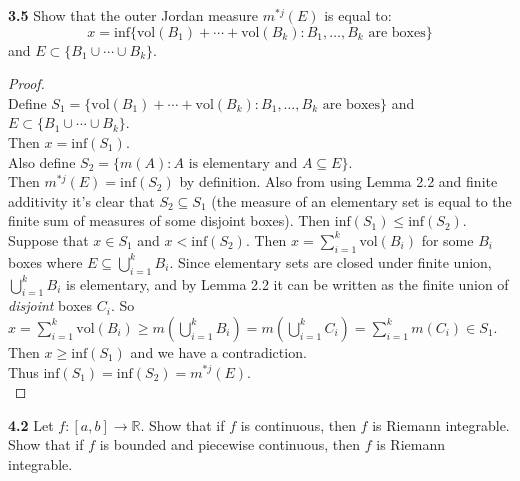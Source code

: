 \documentclass[12pt]{article}
\begin{document}
\hspace{-4 ex}\textbf{3.5} Show that the outer Jordan measure $m^{*j}(E)$ is equal to: $$x = \text{inf}\{\text{vol}(B_1)+\cdots+\text{vol}(B_k) : B_1,\ldots,B_k  \text{ are boxes} \}$$ and $E\subset \{B_1\cup\cdots\cup B_k\}$. \bigbreak

	\begin{proof}  \text{ }\\
		Define $S_1 =  \{\text{vol}(B_1)+\cdots+\text{vol}(B_k) : B_1,\ldots,B_k  \text{ are boxes} \}$ and $E\subset \{B_1\cup\cdots\cup B_k\}$. \\
		Then $x = \text{inf}(S_1)$. \\
		Also define $S_2 = \{m(A) : A \text{ is elementary and } A \subseteq E \}$. \\
		Then $m^{*j}(E) = \text{inf}(S_2)$ by definition. Also from using Lemma 2.2 and finite additivity it's clear that $S_2 \subseteq S_1$ (the measure of an elementary set is equal to the finite sum of measures of some disjoint boxes). Then $\text{inf}(S_1) \leq \text{inf}(S_2)$.\\
		
		Suppose that $x \in S_1$ and $ x < \text{inf}(S_2)$. Then $x = \sum\limits_{i=1}^k \text{vol}(B_i)$ for some $B_i$ boxes where $E \subseteq \bigcup\limits_{i=1}^{k}B_i$. Since elementary sets are closed under finite union,  $\bigcup\limits_{i=1}^{k}B_i$ is elementary, and by Lemma 2.2 it can be written as the finite union of \textit{disjoint} boxes $C_i$. So $x = \sum\limits_{i=1}^k \text{vol}(B_i) \geq m(\bigcup\limits_{i=1}^{k}B_i) = m(\bigcup\limits_{i=1}^{k}C_i) = \sum\limits_{i=1}^{k}m(C_i) \in S_1$. Then $x \geq \text{inf}(S_1)$ and we have a contradiction. \\
		Thus $\text{inf}(S_1) = \text{inf}(S_2) = m^{*j}(E)$. \\ 
	\end{proof}



\hspace{-4 ex}\textbf{4.2} Let $f\colon[a,b]\to\mathbb{R}$. Show that if $f$ is continuous, then $f$ is Riemann integrable. Show that if $f$ is bounded and piecewise continuous, then $f$ is Riemann integrable. \bigbreak
\end{document}
